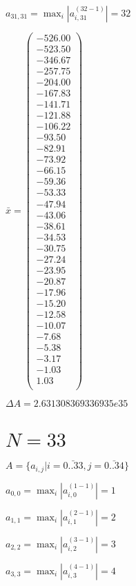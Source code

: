 \documentclass[a4paper,12pt]{article}
\begin{document}
$a _{ 31, 31 } =  \max _i |a _{ i, 31 } ^{ (32 - 1) } | = 32$

$\bar { x } = \begin{pmatrix}
-526.00 \\
-523.50 \\
-346.67 \\
-257.75 \\
-204.00 \\
-167.83 \\
-141.71 \\
-121.88 \\
-106.22 \\
-93.50 \\
-82.91 \\
-73.92 \\
-66.15 \\
-59.36 \\
-53.33 \\
-47.94 \\
-43.06 \\
-38.61 \\
-34.53 \\
-30.75 \\
-27.24 \\
-23.95 \\
-20.87 \\
-17.96 \\
-15.20 \\
-12.58 \\
-10.07 \\
-7.68 \\
-5.38 \\
-3.17 \\
-1.03 \\
1.03 \\
\end{pmatrix}
$

$\Delta A = 2.631308369336935e35$



\section{ $N = 33$ }
$A = \{ a _{ i, j } | i = \bar { 0..33 }, j = \bar { 0..34 } \}$

$a _{ 0, 0 } =  \max _i |a _{ i, 0 } ^{ (1 - 1) } | = 1$

$a _{ 1, 1 } =  \max _i |a _{ i, 1 } ^{ (2 - 1) } | = 2$

$a _{ 2, 2 } =  \max _i |a _{ i, 2 } ^{ (3 - 1) } | = 3$

$a _{ 3, 3 } =  \max _i |a _{ i, 3 } ^{ (4 - 1) } | = 4$
\end{document}
